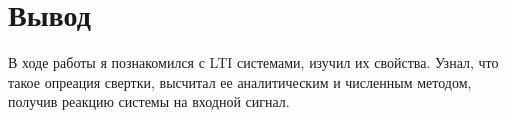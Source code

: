 \chapter{Вывод}
\label{ch:сhap5}

В ходе работы я познакомился с LTI системами, изучил их свойства. Узнал, что такое опреация свертки, высчитал ее аналитическим
и численным методом, получив реакцию системы на входной сигнал.


\endinput